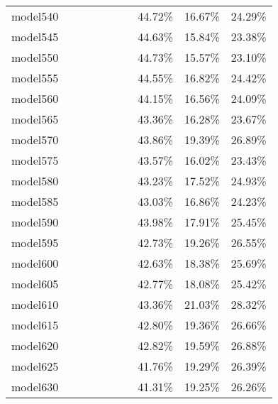 \begin{longtable}{@{}llllllllll@{}}
model540 &         &         &         &          &         &         & 44.72\%  & 16.67\% & 24.29\% \\
model545 &         &         &         &          &         &         & 44.63\%  & 15.84\% & 23.38\% \\
model550 &         &         &         &          &         &         & 44.73\%  & 15.57\% & 23.10\% \\
model555 &         &         &         &          &         &         & 44.55\%  & 16.82\% & 24.42\% \\
model560 &         &         &         &          &         &         & 44.15\%  & 16.56\% & 24.09\% \\
model565 &         &         &         &          &         &         & 43.36\%  & 16.28\% & 23.67\% \\
model570 &         &         &         &          &         &         & 43.86\%  & 19.39\% & 26.89\% \\
model575 &         &         &         &          &         &         & 43.57\%  & 16.02\% & 23.43\% \\
model580 &         &         &         &          &         &         & 43.23\%  & 17.52\% & 24.93\% \\
model585 &         &         &         &          &         &         & 43.03\%  & 16.86\% & 24.23\% \\
model590 &         &         &         &          &         &         & 43.98\%  & 17.91\% & 25.45\% \\
model595 &         &         &         &          &         &         & 42.73\%  & 19.26\% & 26.55\% \\
model600 &         &         &         &          &         &         & 42.63\%  & 18.38\% & 25.69\% \\
model605 &         &         &         &          &         &         & 42.77\%  & 18.08\% & 25.42\% \\
model610 &         &         &         &          &         &         & 43.36\%  & 21.03\% & 28.32\% \\
model615 &         &         &         &          &         &         & 42.80\%  & 19.36\% & 26.66\% \\
model620 &         &         &         &          &         &         & 42.82\%  & 19.59\% & 26.88\% \\
model625 &         &         &         &          &         &         & 41.76\%  & 19.29\% & 26.39\% \\
model630 &         &         &         &          &         &         & 41.31\%  & 19.25\% & 26.26\% \\

\end{longtable}
